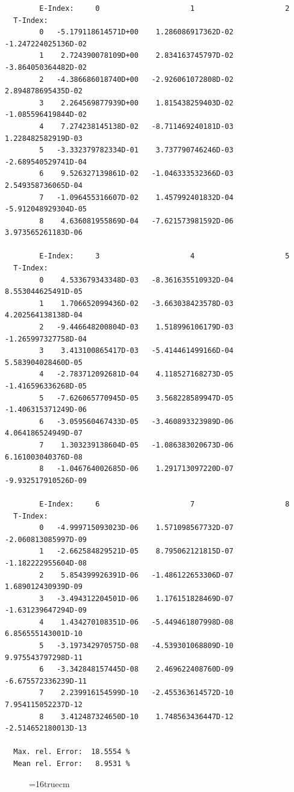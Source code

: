 \documentclass[12pt,dvips]{article}
\begin{document}
\begin{small}\begin{verbatim}
        E-Index:     0                     1                     2
  T-Index:
        0   -5.179118614571D+00    1.286086917362D-02   -1.247224025136D-02
        1    2.724390078109D+00    2.834163745797D-02   -3.864050364482D-02
        2   -4.386686018740D+00   -2.926061072808D-02    2.894878695435D-02
        3    2.264569877939D+00    1.815438259403D-02   -1.085596419844D-02
        4    7.274238145138D-02   -8.711469240181D-03    1.228482582919D-03
        5   -3.332379782334D-01    3.737790746246D-03   -2.689540529741D-04
        6    9.526327139861D-02   -1.046333532366D-03    2.549358736065D-04
        7   -1.096455316607D-02    1.457992401832D-04   -5.912048929304D-05
        8    4.636081955869D-04   -7.621573981592D-06    3.973565261183D-06

        E-Index:     3                     4                     5
  T-Index:
        0    4.533679343348D-03   -8.361635510932D-04    8.553044625491D-05
        1    1.706652099436D-02   -3.663038423578D-03    4.202564138138D-04
        2   -9.446648200804D-03    1.518996106179D-03   -1.265997327758D-04
        3    3.413100865417D-03   -5.414461499166D-04    5.583904028460D-05
        4   -2.783712092681D-04    4.118527168273D-05   -1.416596336268D-05
        5   -7.626065770945D-05    3.568228589947D-05   -1.406315371249D-06
        6   -3.059560467433D-05   -3.460893323989D-06    4.064186524949D-07
        7    1.303239138604D-05   -1.086383020673D-06    6.161003040376D-08
        8   -1.046764002685D-06    1.291713097220D-07   -9.932517910526D-09

        E-Index:     6                     7                     8
  T-Index:
        0   -4.999715093023D-06    1.571098567732D-07   -2.060813085997D-09
        1   -2.662584829521D-05    8.795062121815D-07   -1.182222955604D-08
        2    5.854399926391D-06   -1.486122653306D-07    1.689012430939D-09
        3   -3.494312204501D-06    1.176151828469D-07   -1.631239647294D-09
        4    1.434270108351D-06   -5.449461807998D-08    6.856555143001D-10
        5   -3.197342970575D-08   -4.539301068809D-10    9.975543797298D-11
        6   -3.342848157445D-08    2.469622408760D-09   -6.675572336239D-11
        7    2.239916154599D-10   -2.455363614572D-10    7.954115052237D-12
        8    3.412487324650D-10    1.748563436447D-12   -2.514652180013D-13

  Max. rel. Error:  18.5554 %
  Mean rel. Error:   8.9531 %

\end{verbatim}\end{small}
\begin{figure} \label{2.0c}
\epsfxsize=16truecm
\end{figure}
\newpage
\end{document}
